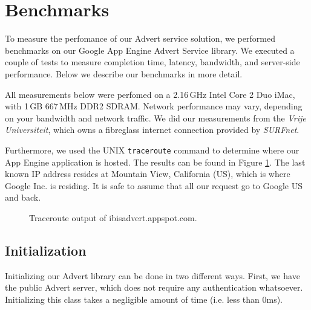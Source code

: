 \section{Benchmarks}
\label{benchmarks}
To measure the perfomance of our Advert service solution, we performed
benchmarks on our Google App Engine Advert Service library. We executed a
couple of tests to measure completion time, latency, bandwidth, and server-side
performance. Below we describe our benchmarks in more detail.

All measurements below were perfomed on a 2.16\,GHz Intel Core 2 Duo iMac, with
1\,GB 667\,MHz DDR2 SDRAM. Network performance may vary, depending on your
bandwidth and network traffic. We did our measurements from the \emph{Vrije
Universiteit}, which owns a fibreglass internet connection provided by
\emph{SURFnet}.

Furthermore, we used the UNIX \texttt{traceroute} command to determine where our
App Engine application is hosted. The results can be found in Figure
\ref{tracert}. The last known IP address resides at Mountain View, California
(US), which is where Google Inc. is residing. It is safe to assume that all our
request go to Google US and back.

\begin{figure} %
\begin{center}
\caption{Traceroute output of ibisadvert.appspot.com.\label{tracert}}
\end{center}
\end{figure}

\subsection{Initialization}
Initializing our Advert library can be done in two different ways. First, we
have the public Advert server, which does not require any authentication 
whatsoever. Initializing this class takes a negligible amount of time (i.e.
less than 0ms).

